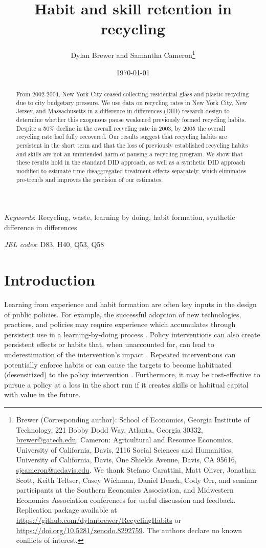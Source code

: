 \documentclass[12pt]{article}
\title{Habit and skill retention in recycling}
\author{Dylan Brewer and Samantha Cameron\thanks{Brewer (Corresponding author): School of Economics, Georgia Institute of Technology, 221 Bobby Dodd Way, Atlanta, Georgia 30332, \href{mailto:brewer@gatech.edu}{brewer@gatech.edu}.  Cameron: Agricultural and Resource Economics, University of California, Davis, 2116 Social Sciences and Humanities, University of California, Davis, One Shields Avenue, Davis, CA 95616, \href{mailto:sjcameron@ucdavis.edu}{sjcameron@ucdavis.edu}.  We thank Stefano Carattini, Matt Oliver, Jonathan Scott, Keith Teltser, Casey Wichman, Daniel Dench, Cody Orr, and seminar participants at the Southern Economics Association, and Midwestern Economics Association conferences for useful discussion and feedback. Replication package available at \href{https://github.com/dylanbrewer/RecyclingHabits}{https://github.com/dylanbrewer/RecyclingHabits} or \href{https://doi.org/10.5281/zenodo.8292759}{https://doi.org/10.5281/zenodo.8292759}. The authors declare no known conflicts of interest.}}
\date{\today}
\begin{document}
\maketitle

\begin{abstract}
\begin{singlespace}
\noindent
From 2002-2004, New York City ceased collecting residential glass and plastic recycling due to city budgetary pressure.  We use data on recycling rates in New York City, New Jersey, and Massachusetts in a difference-in-differences (DID) research design to determine whether this exogenous pause weakened previously formed recycling habits.  Despite a 50\% decline in the overall recycling rate in 2003, by 2005 the overall recycling rate had fully recovered.  Our results suggest that recycling habits are persistent in the short term and that the loss of previously established recycling habits and skills are not an unintended harm of pausing a recycling program.  We show that these results hold in the standard DID approach, as well as a synthetic DID approach modified to estimate time-disaggregated treatment effects separately, which eliminates pre-trends and improves the precision of our estimates.
\end{singlespace}
\end{abstract}
\noindent \textit{Keywords}: Recycling, waste, learning by doing, habit formation, synthetic difference in differences

\noindent \textit{JEL codes}: D83, H40, Q53, Q58

\clearpage

\section{Introduction}

Learning from experience and habit formation are often key inputs in the design of public policies.  For example, the successful adoption of new technologies, practices, and policies may require experience which accumulates through persistent use in a learning-by-doing process \citep{fosterrosenzweig1995}.  Policy interventions can also create persistent effects or habits that, when unaccounted for, can lead to underestimation of the intervention's impact \citep{allcottrogers2014}.  Repeated interventions can potentially enforce habits or can cause the targets to become habituated (desensitized) to the policy intervention \citep{itoidatanaka2018}.  Furthermore, it may be cost-effective to pursue a policy at a loss in the short run if it creates skills or habitual capital with value in the future.
\end{document}
